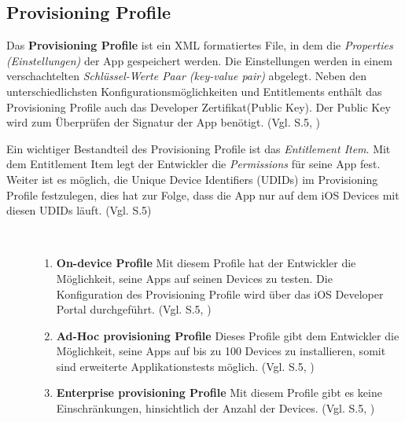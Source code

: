 \subsection{Provisioning Profile}
\label{sec:ProvisioningProfile}
Das \textbf{Provisioning Profile} ist ein XML formatiertes File, in dem die \textit{\glqq Properties (Einstellungen)\grqq{}} der App gespeichert werden. Die Einstellungen werden in einem verschachtelten \textit{\glqq Schlüssel-Werte Paar (key-value pair)\grqq{}} abgelegt. Neben den unterschiedlichsten Konfigurationsmöglichkeiten und Entitlements enthält das Provisioning Profile auch das Developer Zertifikat(Public Key). Der Public Key wird zum Überprüfen der Signatur der App benötigt. (Vgl. \cite{iOSSec[5]} S.5, \cite{Hacking[1], ProvisioningProfile[1], ProvisioningProfile[2]}) \par
Ein wichtiger Bestandteil des Provisioning Profile ist das \textit{\glqq Entitlement Item\grqq{}}. Mit dem Entitlement Item legt der Entwickler die \textit{\glqq Permissions\grqq{}} für seine App fest. Weiter ist es möglich, die Unique Device Identifiers (UDIDs) im Provisioning Profile festzulegen, dies hat zur Folge, dass die App nur auf dem iOS Devices mit diesen UDIDs läuft. (Vgl. \cite{iOSSec[5]} S.5) \par 

\begin{description}
    \item[\parbox{\textwidth} {Es gibt drei unterschiedliche Arten von Provisioning Profiles }]~\par
    \begin{enumerate}
        \item \textbf{On-device Profile} \newline
Mit diesem Profile hat der Entwickler die Möglichkeit, seine Apps auf seinen Devices zu testen. Die Konfiguration des Provisioning Profile wird über das iOS Developer Portal durchgeführt. (Vgl. \cite{iOSSec[5]} S.5, \cite{AppDist[1]})
    
        \item \textbf{Ad-Hoc provisioning Profile} \newline
Dieses Profile gibt dem Entwickler die Möglichkeit, seine Apps auf bis zu 100 Devices zu installieren, somit sind erweiterte Applikationstests möglich. (Vgl. \cite{iOSSec[5]} S.5, \cite{AppDist[1]})
    
        \item \textbf{Enterprise provisioning Profile} \newline
Mit diesem Profile gibt es keine Einschränkungen, hinsichtlich der Anzahl der Devices. (Vgl. \cite{iOSSec[5]} S.5, \cite{AppDist[1]})
    \end{enumerate}
\end{description} 


